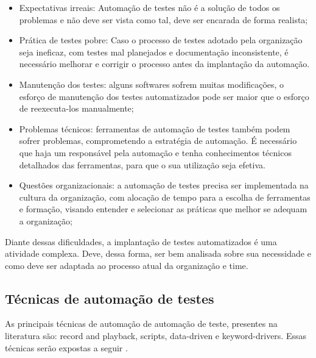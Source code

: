 \begin{itemize}
	\item Expectativas irreais: Automação de testes não é a solução de todos os
problemas e não deve ser vista como tal, deve ser encarada de forma realista;
	\item Prática de testes pobre: Caso o processo de testes adotado pela organização seja ineficaz, com testes mal planejados e documentação inconsistente, é necessário melhorar e corrigir o processo antes da implantação da automação.
	\item Manutenção dos testes: alguns softwares sofrem muitas modificações, o esforço de manutenção dos testes automatizados pode ser maior que o esforço de reexecuta-los manualmente;
	\item Problemas técnicos:  ferramentas de automação de testes também podem sofrer problemas, comprometendo a estratégia de automação. É necessário que haja um responsável  pela automação e tenha conhecimentos técnicos detalhados das ferramentas, para que o sua utilização seja efetiva.
	\item Questões organizacionais: a automação de testes precisa ser implementada na cultura da organização, com alocação de tempo para a escolha de ferramentas e formação, visando entender e selecionar as práticas que melhor se adequam a organização;
\end{itemize}

Diante dessas dificuldades, a implantação de testes automatizados é uma atividade complexa. Deve, dessa forma, ser bem analisada sobre sua necessidade e como deve ser adaptada ao processo atual da organização e time.

\subsection{Técnicas de automação de testes}

As principais técnicas de automação de automação de teste, presentes na literatura são: record and playback, scripts, data-driven e keyword-drivers. Essas técnicas serão expostas a seguir \cite{Fantinato2004}.

